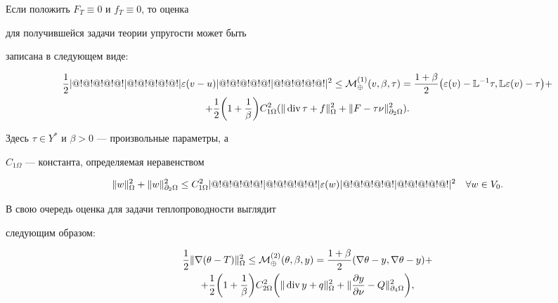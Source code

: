 Если положить $F_T\equiv 0$ и $f_T\equiv 0$, то оценка


для получившейся задачи теории упругости может быть


записана в следующем виде:


\begin{multline}


\frac{1}{2}\norme{\varepsilon(v-u)}^2 \le


{\cal M}^{(1)}_\oplus(v,\beta,\tau) =


\frac{1+\beta}{2}


\big(\varepsilon(v) -{\Bbb L}^{-1}\tau, {\Bbb


L}\varepsilon(v) - \tau\big) +\\


%


+\frac{1}{2}\bigg(1+\frac{1}{\beta} \bigg) C_{1\Omega}^2


(\norm{\Div \tau + f}^2_{\Omega} +


\norm{F-\tau\nu}^2_{\partial_2\Omega}).


\label{mpluse}


\end{multline}


Здесь $\tau \in Y^*$ и $\beta>0$ --- произвольные параметры, а


$C_{1\Omega}$ --- константа, определяемая неравенством


\begin{equation}


\label{ineq:c1}


\norm{w}^2_{\Omega}  + \norm{w}^2_{\partial_2\Omega}


\le C_{1\Omega}^2 \norme{\varepsilon(w)}^2 \quad \forall w\in V_0.


\end{equation}





В свою очередь оценка для задачи теплопроводности выглядит


следующим образом:


\begin{multline}


\frac{1}{2}\norm{\nabla(\theta-T)}^2_{\Omega} \le


{\cal M}^{(2)}_\oplus(\theta,\beta,y) =


\frac{1+\beta}{2} (\nabla \theta - y,


\nabla \theta - y ) +\\


%


+\frac{1}{2} \bigg(1+\frac{1}{\beta} \bigg)


C_{2\Omega}^2 \bigg(\norm{\Div y + q}^2_{\Omega} +


\norm{\frac{\partial y}{\partial \nu} - Q}^2_{\partial_4\Omega} \bigg),


\label{mplust}


\end{multline}


